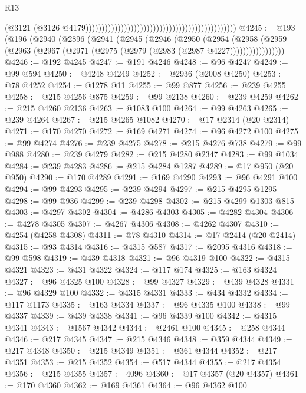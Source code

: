 \begin{lexlean}{R13}
\begin{coremodule}
                                                                                              (@3121
                                                                                                (@3126
                                                                                                  @4179)))))))))))))))))))))))))))))))))))))))))))))))
@4245 := @193
    (@196
      (@2940
        (@2896
          (@2941
            (@2945
              (@2946
                (@2950
                  (@2954
                    (@2958
                      (@2959 (@2963 (@2967 (@2971 (@2975 (@2979 (@2983 (@2987 @4227)))))))))))))))))
@4246 := @192 @4245
@4247 := @191 @4246
@4248 := @96 @4247
@4249 := @99 @594
@4250 := @4248 @4249
@4252 := @2936 (@2008 @4250)
@4253 := @78 @4252
@4254 := @1278 @11
@4255 := @99 @877
@4256 := @239 @4255
@4258 := @215 @4256 @875
@4259 := @99 @2138
@4260 := @239 @4259
@4262 := @215 @4260 @2136
@4263 := @1083 @100
@4264 := @99 @4263
@4265 := @239 @4264
@4267 := @215 @4265 @1082
@4270 := @17 @2314 (@20 @2314)
@4271 := @170 @4270
@4272 := @169 @4271
@4274 := @96 @4272 @100
@4275 := @99 @4274
@4276 := @239 @4275
@4278 := @215 @4276 @738
@4279 := @99 @988
@4280 := @239 @4279
@4282 := @215 @4280 @2347
@4283 := @99 @1034
@4284 := @239 @4283
@4286 := @215 @4284 @1287
@4289 := @17 @950 (@20 @950)
@4290 := @170 @4289
@4291 := @169 @4290
@4293 := @96 @4291 @100
@4294 := @99 @4293
@4295 := @239 @4294
@4297 := @215 @4295 @1295
@4298 := @99 @936
@4299 := @239 @4298
@4302 := @215 @4299 @1303 @815
@4303 := @4297 @4302
@4304 := @4286 @4303
@4305 := @4282 @4304
@4306 := @4278 @4305
@4307 := @4267 @4306
@4308 := @4262 @4307
@4310 := @4254 (@4258 @4308)
@4311 := @78 @4310
@4314 := @17 @2414 (@20 @2414)
@4315 := @93 @4314
@4316 := @4315 @587
@4317 := @2095 @4316
@4318 := @99 @598
@4319 := @439 @4318
@4321 := @96 @4319 @100
@4322 := @4315 @4321
@4323 := @431 @4322
@4324 := @117 @174
@4325 := @163 @4324
@4327 := @96 @4325 @100
@4328 := @99 @4327
@4329 := @439 @4328
@4331 := @96 @4329 @100
@4332 := @4315 @4331
@4333 := @434 @4332
@4334 := @117 @1173
@4335 := @163 @4334
@4337 := @96 @4335 @100
@4338 := @99 @4337
@4339 := @439 @4338
@4341 := @96 @4339 @100
@4342 := @4315 @4341
@4343 := @1567 @4342
@4344 := @2461 @100
@4345 := @258 @4344
@4346 := @217 @4345
@4347 := @215 @4346
@4348 := @359 @4344
@4349 := @217 @4348
@4350 := @215 @4349
@4351 := @361 @4344
@4352 := @217 @4351
@4353 := @215 @4352
@4354 := @517 @4344
@4355 := @217 @4354
@4356 := @215 @4355
@4357 := 4096
@4360 := @17 @4357 (@20 @4357)
@4361 := @170 @4360
@4362 := @169 @4361
@4364 := @96 @4362 @100

\end{coremodule}
\end{lexlean}
